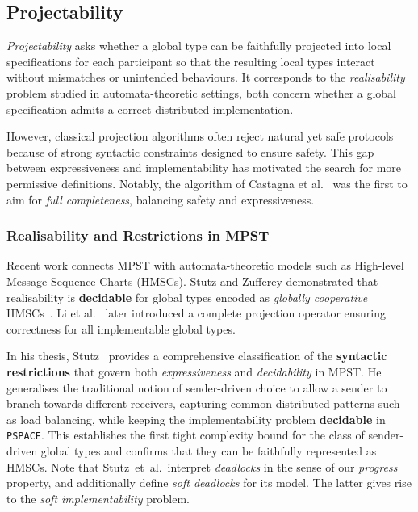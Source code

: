 \subsection{Projectability}
\emph{Projectability} asks whether a global type can be faithfully 
projected into local specifications for each participant so that the 
resulting local types interact without mismatches or unintended 
behaviours.  
It corresponds to the \emph{realisability} problem studied in 
automata-theoretic settings, both concern whether a global specification 
admits a correct distributed implementation.

However, classical projection algorithms often reject natural yet safe 
protocols because of strong syntactic constraints designed to ensure 
safety.  
This gap between expressiveness and implementability has motivated the 
search for more permissive definitions.  
Notably, the algorithm of Castagna et al.~\cite{castagna2012global} 
was the first to aim for \emph{full completeness}, balancing safety 
and expressiveness.

\subsubsection{Realisability and Restrictions in MPST}
Recent work connects MPST with automata-theoretic models such as High-level 
Message Sequence Charts (HMSCs). Stutz and Zufferey demonstrated that 
realisability is \textbf{decidable} for global types encoded as 
\emph{globally cooperative} HMSCs~\cite{DBLP:journals/corr/abs-2209-10328,DBLP:conf/ecoop/Stutz23}.  
Li et al.~\cite{li2023complete} later introduced a complete projection operator 
ensuring correctness for all implementable global types.  

In his thesis, Stutz~\cite{stutz2024implementability} provides a comprehensive 
classification of the \textbf{syntactic restrictions} that govern both 
\emph{expressiveness} and \emph{decidability} in MPST.  
He generalises the traditional notion of sender-driven choice to allow a sender 
to branch towards different receivers, capturing common distributed patterns 
such as load balancing, while keeping the implementability 
problem \textbf{decidable} in \verb|PSPACE|.  
This establishes the first tight complexity bound for the class of 
sender-driven global types and confirms that they can be faithfully 
represented as HMSCs.  
Note that Stutz~et~al.\ interpret \emph{deadlocks} in the sense of our
\emph{progress} property, and additionally define \emph{soft deadlocks}
for its model.
The latter gives rise to the \emph{soft implementability} problem.

